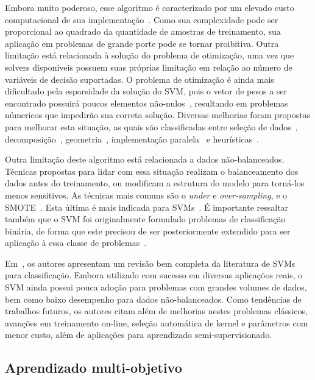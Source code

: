 \documentclass[conference]{IEEEtran}
\begin{document}
 	Embora muito poderoso, esse algoritmo é caracterizado por um elevado custo computacional de sua implementação~\cite{bottou2007support}. Como sua complexidade pode ser proporcional ao quadrado da quantidade de amostras de treinamento, sua aplicação em problemas de grande porte pode se tornar proibitiva. Outra limitação está relacionada à solução do problema de otimização, uma vez que solvers disponíveis possuem suas próprias limitação em relação ao número de variáveis de decisão suportadas. O problema de otimização é ainda mais dificultado pela esparsidade da solução do SVM, pois o vetor de pesos a ser encontrado possuirá poucos elementos não-nulos~\cite{haykin2007neural}, resultando em problemas númericos que impedirão sua correta solução. Diversas melhorias foram propostas para melhorar esta situação, as quais são classificadas entre seleção de dados~\cite{wang2005training}, decomposição~\cite{dong2005fast}, geometria~\cite{zeng2008geometric}, implementação paralela~\cite{graf2004parallel} e heurísticas~\cite{decoste2000alpha}.
 	
 	Outra limitação deste algoritmo está relacionada a dados não-balanceados. Técnicas propostas para lidar com essa situação realizam o balanceamento dos dados antes do treinamento, ou modificam a estrutura do modelo para torná-los menos sensitivos. As técnicas mais comuns são o \textit{under} e \textit{over-sampling}, e o SMOTE~\cite{chawla2002smote}. Esta última é mais indicada para SVMs~\cite{chawla2003smoteboost}. É importante ressaltar também que o SVM foi originalmente formulado problemas de classificação binária, de forma que este precisou de ser posteriormente extendido para ser aplicação à essa classe de problemas~\cite{weston1998multi, liu2005one}.
 	
	
	Em~\cite{cervantes2020comprehensive}, os autores apresentam um revisão bem completa da literatura de SVMs para classificação. Embora utilizado com sucesso em diversas aplicaçõos reais, o SVM ainda possui pouca adoção para problemas com grandes volumes de dados, bem como baixo desempenho para dados não-balanceados. Como tendências de trabalhos futuros, os autores citam além de melhorias nestes problemas clássicos, avanções em treinamento on-line, seleção automática de kernel e parâmetros com menor custo, além de aplicações para aprendizado semi-supervisionado.
	
	\subsection{Aprendizado multi-objetivo}
	
\end{document}
